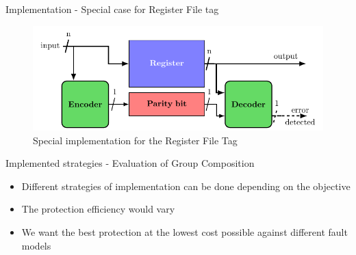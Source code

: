 \begin{frame}{Implementation - Special case for Register File tag}
    \begin{figure}
        \centering
        \includegraphics[width=.9\textwidth, page=5]{src/4_strategies/img/archi_contremesures.pdf}
        \caption{Special implementation for the Register File Tag}
        \label{fig:secded_implem_rf}
    \end{figure}
\end{frame}
\begin{frame}{Implemented strategies - Evaluation of Group Composition}
    \begin{block}{}
        \begin{itemize}
            \justifying
            \item Different strategies of implementation can be done depending on the objective
            \item The protection efficiency would vary
            \item We want the best protection at the lowest cost possible against different fault models
        \end{itemize}
    \end{block}
\end{frame}

